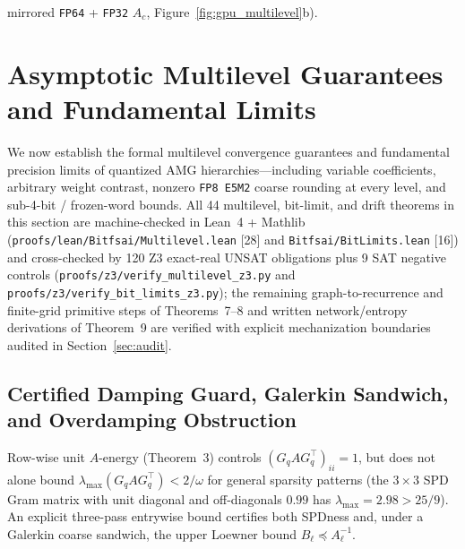 \documentclass[10pt]{article}
\begin{document}
mirrored \texttt{FP64} + \texttt{FP32} $A_c$, Figure~\ref{fig:gpu_multilevel}b).

\section{Asymptotic Multilevel Guarantees and Fundamental Limits}\label{sec:theory}
We now establish the formal multilevel convergence guarantees and fundamental precision limits of quantized AMG hierarchies---including variable coefficients, arbitrary weight contrast, nonzero \texttt{FP8 E5M2} coarse rounding at every level, and sub-4-bit / frozen-word bounds. All 44 multilevel, bit-limit, and drift theorems in this section are machine-checked in Lean~4 + Mathlib (\texttt{proofs/lean/Bitfsai/Multilevel.lean} [28] and \texttt{Bitfsai/BitLimits.lean} [16]) and cross-checked by 120 Z3 exact-real UNSAT obligations plus 9 SAT negative controls (\texttt{proofs/z3/verify\_multilevel\_z3.py} and \texttt{proofs/z3/verify\_bit\_limits\_z3.py}); the remaining graph-to-recurrence and finite-grid primitive steps of Theorems~7--8 and written network/entropy derivations of Theorem~9 are verified with explicit mechanization boundaries audited in Section~\ref{sec:audit}.

\subsection{Certified Damping Guard, Galerkin Sandwich, and Overdamping Obstruction}
Row-wise unit $A$-energy (Theorem~3) controls $(G_q A G_q^\top)_{ii} = 1$, but does not alone bound $\lambda_{\max}(G_q A G_q^\top) < 2/\omega$ for general sparsity patterns (the $3\times 3$ SPD Gram matrix with unit diagonal and off-diagonals $0.99$ has $\lambda_{\max} = 2.98 > 25/9$). An explicit three-pass entrywise bound certifies both SPDness and, under a Galerkin coarse sandwich, the upper Loewner bound $B_\ell \preceq A_\ell^{-1}$.
\end{document}
